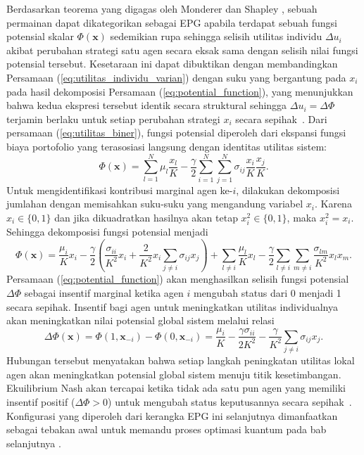 Berdasarkan teorema yang digagas oleh Monderer dan Shapley \cite{monderer_potential_1996}, sebuah permainan dapat dikategorikan sebagai EPG apabila terdapat sebuah fungsi potensial skalar $\Phi(\mathbf{x})$ sedemikian rupa sehingga selisih utilitas individu $\Delta u_i$ akibat perubahan strategi satu agen secara eksak sama dengan selisih nilai fungsi potensial tersebut. Kesetaraan ini dapat dibuktikan dengan membandingkan Persamaan (\ref{eq:utilitas_individu_varian}) dengan suku yang bergantung pada $x_i$ pada hasil dekomposisi Persamaan (\ref{eq:potential_function}), yang menunjukkan bahwa kedua ekspresi tersebut identik secara struktural sehingga $\Delta u_i = \Delta \Phi$ terjamin berlaku untuk setiap perubahan strategi $x_i$ secara sepihak~\cite{john_von_neumann_theory_1953}. Dari persamaan (\ref{eq:utilitas_biner}), fungsi potensial diperoleh dari ekspansi fungsi biaya portofolio yang terasosiasi langsung dengan identitas utilitas sistem:
\begin{equation}
    \Phi(\mathbf{x}) = \sum_{l=1}^N \mu_l \frac{x_l}{K} - \frac{\gamma}{2}\sum_{i=1}^N\sum_{j=1}^N \sigma_{ij} \frac{x_i}{K} \frac{x_j}{K}.
    \label{eq:potential_markowitz}
\end{equation}
Untuk mengidentifikasi kontribusi marginal agen ke-$i$, dilakukan dekomposisi jumlahan dengan memisahkan suku-suku yang mengandung variabel $x_i$. Karena $x_i \in \{0,1\}$ dan jika dikuadratkan hasilnya akan tetap $x_i^2 \in \{0,1\}$, maka $x_i^2 = x_i$. Sehingga dekomposisi fungsi potensial menjadi
\begin{equation}
    \Phi(\mathbf{x}) = \frac{\mu_i}{K}x_i - \frac{\gamma}{2} \left( \frac{\sigma_{ii}}{K^2}x_i + \frac{2}{K^2}x_i \sum_{j \neq i} \sigma_{ij}x_j \right) + \sum_{l \neq i} \frac{\mu_l}{K}x_l - \frac{\gamma}{2} \sum_{l \neq i} \sum_{m \neq i} \frac{\sigma_{lm}}{K^2}x_l x_m.
    \label{eq:potential_function}
\end{equation}
Persamaan (\ref{eq:potential_function}) akan menghasilkan selisih fungsi potensial $\Delta \Phi$ sebagai insentif marginal ketika agen $i$ mengubah status dari 0 menjadi 1 secara sepihak. Insentif bagi agen untuk meningkatkan utilitas individualnya akan meningkatkan nilai potensial global sistem melalui relasi
\begin{equation}
\label{eq:insentif_marginal}
\Delta \Phi(\mathbf{x}) = \Phi(1, \mathbf{x}_{-i}) - \Phi(0, \mathbf{x}_{-i}) = \frac{\mu_i}{K} - \frac{\gamma \sigma_{ii}}{2K^2} - \frac{\gamma}{K^2} \sum_{j \neq i} \sigma_{ij} x_j.
\end{equation}
Hubungan tersebut menyatakan bahwa setiap langkah peningkatan utilitas lokal agen akan meningkatkan potensial global sistem menuju titik kesetimbangan. Ekuilibrium Nash akan tercapai ketika tidak ada satu pun agen yang memiliki insentif positif ($\Delta \Phi > 0$) untuk mengubah status keputusannya secara sepihak~. Konfigurasi yang diperoleh dari kerangka EPG ini selanjutnya dimanfaatkan sebagai tebakan awal untuk memandu proses optimasi kuantum pada bab selanjutnya .